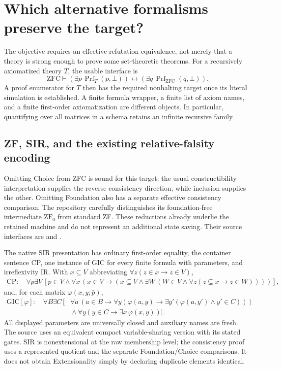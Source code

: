 \section{Which alternative formalisms preserve the target?}
\label{sec:formalism-inventory}

The objective requires an effective refutation equivalence, not merely
that a theory is strong enough to prove some set-theoretic theorems.
For a recursively axiomatized theory $T$, the usable interface is
\[
 \mathrm{ZFC}\vdash
  (\exists p\,\operatorname{Prf}_{T}(p,\bot))
  \longleftrightarrow
  (\exists q\,\operatorname{Prf}_{\mathrm{ZFC}}(q,\bot)).
\]
A proof enumerator for $T$ then has the required nonhalting target
once its literal simulation is established.  A finite formula wrapper,
a finite list of axiom names, and a finite first-order axiomatization
are different objects.  In particular, quantifying over all matrices
in a schema retains an infinite recursive family.

\subsection{ZF, SIR, and the existing relative-falsity encoding}

Omitting Choice from ZFC is sound for this target: the usual
constructibility interpretation supplies the reverse consistency
direction, while inclusion supplies the other.  Omitting Foundation
also has a separate effective consistency comparison.  The repository
carefully distinguishes its foundation-free intermediate $\mathrm{ZF}_0$
from standard ZF.  These reductions already underlie the retained
machine and do not represent an additional state saving.  Their
source interfaces are 
and .

The native SIR presentation has ordinary first-order equality, the
container sentence CP, one instance of GIC for every finite formula
with parameters, and irreflexivity IR.  With
$x\subseteq V$ abbreviating $\forall z(z\in x\to z\in V)$,
\[
\begin{split}
\mathrm{CP}:\quad \forall p\exists V\,[p\in V\land
 \forall x\,(x\in V\to (x\subseteq V\land
  \exists W\,(W\in V\land
    \forall z(z\subseteq x\to z\in W))))],
\end{split}
\]
and, for each matrix $\varphi(x,y;\bar p)$,
\[
\begin{split}
\mathrm{GIC}[\varphi]:\quad\forall B\exists C\,[{}&
 \forall a\,(a\in B\to
  \forall y(\varphi(a,y)\to
    \exists y'(\varphi(a,y')\land y'\in C)))\\
 &{}\land\forall y(y\in C\to\exists x\,\varphi(x,y))].
\end{split}
\]
All displayed parameters are universally closed and auxiliary names
are fresh.  The source uses an equivalent compact variable-sharing
version with its stated gates.  SIR is nonextensional at the raw
membership level; the consistency proof uses a represented quotient
and the separate Foundation/Choice comparisons.  It does not obtain
Extensionality simply by declaring duplicate elements identical.

